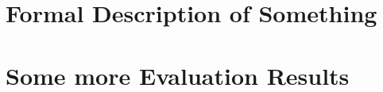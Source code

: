 

\cleardoublepage\chapter{Formal Description of Something}\minitoc\label{sec:formal}\vspace{.5cm}
\noindent\lipsum[7]

\cleardoublepage\chapter{Some more Evaluation Results}\minitoc\label{sec:moreeval}\vspace{.5cm}
\noindent\lipsum[7]
